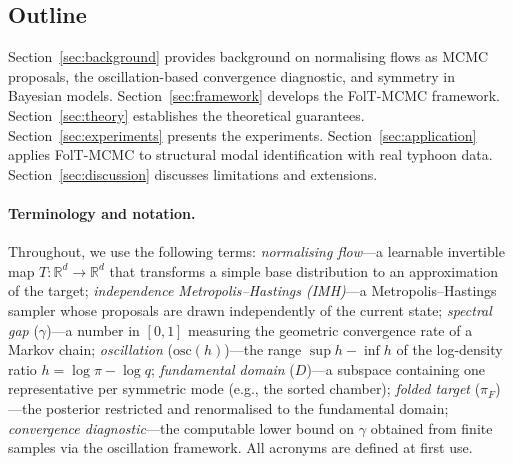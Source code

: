 \subsection{Outline}

Section~\ref{sec:background} provides background on normalising
flows as MCMC proposals, the oscillation-based convergence
diagnostic, and symmetry in Bayesian models.
Section~\ref{sec:framework} develops the FolT-MCMC framework.
Section~\ref{sec:theory} establishes the theoretical guarantees.
Section~\ref{sec:experiments} presents the experiments.
Section~\ref{sec:application} applies FolT-MCMC to structural
modal identification with real typhoon data.
Section~\ref{sec:discussion} discusses limitations and extensions.

\paragraph{Terminology and notation.}
Throughout, we use the following terms:
\emph{normalising flow}---a learnable invertible map
  $T\colon \mathbb{R}^d \to \mathbb{R}^d$ that transforms a
  simple base distribution to an approximation of the target;
\emph{independence Metropolis--Hastings (IMH)}---a
  Metropolis--Hastings sampler whose proposals are drawn
  independently of the current state;
\emph{spectral gap} ($\gamma$)---a number in $[0,1]$ measuring
  the geometric convergence rate of a Markov chain;
\emph{oscillation} ($\mathrm{osc}(h)$)---the range
  $\sup h - \inf h$ of the log-density ratio
  $h = \log\pi - \log q$;
\emph{fundamental domain} ($D$)---a subspace containing one
  representative per symmetric mode (e.g., the sorted chamber);
\emph{folded target} ($\pi_F$)---the posterior restricted and
  renormalised to the fundamental domain;
\emph{convergence diagnostic}---the computable lower bound on
  $\gamma$ obtained from finite samples via the oscillation
  framework.
All acronyms are defined at first use.
